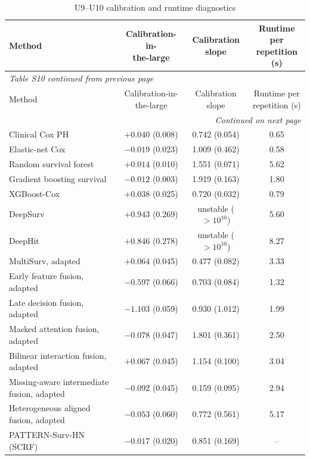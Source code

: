 \documentclass[pdflatex,sn-nature]{sn-jnl}
\begin{document}
\begingroup
\footnotesize
\setlength{\tabcolsep}{2pt}
\begin{longtable}{p{3.0cm}ccc}
\caption{U9--U10 calibration and runtime diagnostics}\label{tab:supptable9}\\
\toprule
Method & \makecell{Calibration-in-\\the-large} & \makecell{Calibration\\slope} & \makecell{Runtime per\\repetition (s)}\\
\midrule
\endfirsthead
\multicolumn{4}{l}{\itshape Table S10 continued from previous page}\\
\toprule
Method & \makecell{Calibration-in-\\the-large} & \makecell{Calibration\\slope} & \makecell{Runtime per\\repetition (s)}\\
\midrule
\endhead
\midrule
\multicolumn{4}{r}{\itshape Continued on next page}\\
\endfoot
\bottomrule
\endlastfoot
Clinical Cox PH & $+0.040$ (0.008) & 0.742 (0.054) & 0.65\\
Elastic-net Cox & $-0.019$ (0.023) & 1.009 (0.462) & 0.58\\
Random survival forest & $+0.014$ (0.010) & 1.551 (0.071) & 5.62\\
Gradient boosting survival & $-0.012$ (0.003) & 1.919 (0.163) & 1.80\\
XGBoost-Cox & $+0.038$ (0.025) & 0.720 (0.032) & 0.79\\
DeepSurv & $+0.943$ (0.269) & unstable ($>10^{10}$) & 5.60\\
DeepHit & $+0.846$ (0.278) & unstable ($>10^{10}$) & 8.27\\
MultiSurv, adapted & $+0.064$ (0.045) & 0.477 (0.082) & 3.33\\
Early feature fusion, adapted & $-0.597$ (0.066) & 0.703 (0.084) & 1.32\\
Late decision fusion, adapted & $-1.103$ (0.059) & 0.930 (1.012) & 1.99\\
Masked attention fusion, adapted & $-0.078$ (0.047) & 1.801 (0.361) & 2.50\\
Bilinear interaction fusion, adapted & $+0.067$ (0.045) & 1.154 (0.100) & 3.04\\
Missing-aware intermediate fusion, adapted & $-0.092$ (0.045) & 0.159 (0.095) & 2.94\\
Heterogeneous aligned fusion, adapted & $-0.053$ (0.060) & 0.772 (0.561) & 5.17\\
PATTERN-Surv-HN (SCRF) & $-0.017$ (0.020) & 0.851 (0.169) & --\\
\end{longtable}
\endgroup
\end{document}
